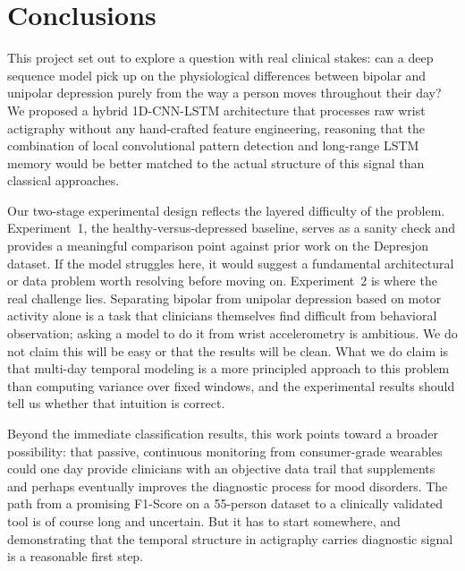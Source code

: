 \section{Conclusions}

This project set out to explore a question with real clinical stakes: can a deep sequence model pick up on the physiological differences between bipolar and unipolar depression purely from the way a person moves throughout their day? We proposed a hybrid 1D-CNN-LSTM architecture that processes raw wrist actigraphy without any hand-crafted feature engineering, reasoning that the combination of local convolutional pattern detection and long-range LSTM memory would be better matched to the actual structure of this signal than classical approaches.

Our two-stage experimental design reflects the layered difficulty of the problem. Experiment~1, the healthy-versus-depressed baseline, serves as a sanity check and provides a meaningful comparison point against prior work on the Depresjon dataset. If the model struggles here, it would suggest a fundamental architectural or data problem worth resolving before moving on. Experiment~2 is where the real challenge lies. Separating bipolar from unipolar depression based on motor activity alone is a task that clinicians themselves find difficult from behavioral observation; asking a model to do it from wrist accelerometry is ambitious. We do not claim this will be easy or that the results will be clean. What we do claim is that multi-day temporal modeling is a more principled approach to this problem than computing variance over fixed windows, and the experimental results should tell us whether that intuition is correct.

Beyond the immediate classification results, this work points toward a broader possibility: that passive, continuous monitoring from consumer-grade wearables could one day provide clinicians with an objective data trail that supplements and perhaps eventually improves the diagnostic process for mood disorders. The path from a promising F1-Score on a 55-person dataset to a clinically validated tool is of course long and uncertain. But it has to start somewhere, and demonstrating that the temporal structure in actigraphy carries diagnostic signal is a reasonable first step.
